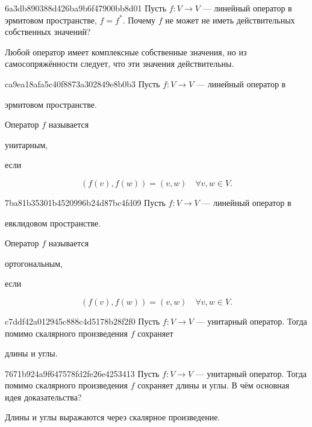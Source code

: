 \begin{note}{6a3db890388d426ba9b6f47900bb8d01}
    Пусть \({ f : V \to V }\) --- линейный оператор в эрмитовом пространстве, \({ f = f^* }\).
    Почему \({ f }\) не может не иметь действительных собственных значений?

    \begin{cloze}{1}
        Любой оператор имеет комплексные собственные значения, но из самосопряжённости следует, что эти значения действительны.
    \end{cloze}
\end{note}

\begin{note}{ca9ea18afa5c40f8873a302849e8b0b3}
    Пусть \({ f : V \to V }\) --- линейный оператор в \begin{icloze}{3}эрмитовом пространстве.\end{icloze}
    Оператор \({ f }\) называется \begin{icloze}{2}унитарным,\end{icloze} если
    \begin{icloze}{1}
        \[
            (f(v), f(w)) = (v, w)  \quad \forall v, w \in V.
        \]
    \end{icloze}
\end{note}

\begin{note}{7ba81b35301b4520996b24d87bc4fd09}
    Пусть \({ f : V \to V }\) --- линейный оператор в \begin{icloze}{3}евклидовом пространстве.\end{icloze}
    Оператор \({ f }\) называется \begin{icloze}{2}ортогональным,\end{icloze} если
    \begin{icloze}{1}
        \[
            (f(v), f(w)) = (v, w)  \quad \forall v, w \in V.
        \]
    \end{icloze}
\end{note}

\begin{note}{c7ddf42a012945c888c4d5178b28f2f0}
    Пусть \({ f : V \to V }\) --- унитарный оператор.
    Тогда помимо скалярного произведения \({ f }\) сохраняет \begin{icloze}{1}длины и углы.\end{icloze}
\end{note}

\begin{note}{7671b924a9f647578fd2fe26e4253413}
    Пусть \({ f : V \to V }\) --- унитарный оператор.
    Тогда помимо скалярного произведения \({ f }\) сохраняет длины и углы.
    В чём основная идея доказательства?

    \begin{cloze}{1}
        Длины и углы выражаются через скалярное произведение.
    \end{cloze}
\end{note}

